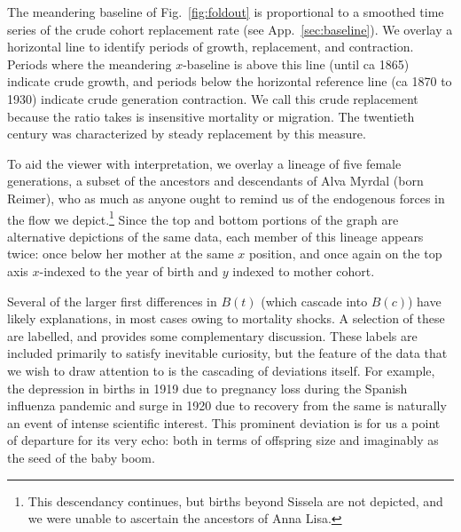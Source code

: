 \documentclass{article}
\begin{document}
The meandering baseline of Fig.~\ref{fig:foldout} is proportional to a smoothed time series of the crude cohort replacement rate (see App.~\ref{sec:baseline}). We overlay a horizontal line to identify periods of growth, replacement, and contraction. Periods where the meandering $x$-baseline is above this line (until ca 1865) indicate crude growth, and periods below the horizontal reference line (ca 1870 to 1930) indicate crude generation contraction. We call this crude replacement because the ratio takes is insensitive mortality or migration. The twentieth century was characterized by steady replacement by this measure.

To aid the viewer with interpretation, we overlay a lineage of five female generations, a subset of the ancestors and descendants of Alva Myrdal (born Reimer), who as much as anyone ought to remind us of the endogenous forces in the flow we depict.\footnote{This descendancy continues, but births beyond Sissela are not depicted, and we were unable to ascertain the ancestors of Anna Lisa.} Since the top and bottom portions of the graph are alternative depictions of the same data, each member of this lineage appears twice: once below her mother at the same $x$ position, and once again on the top axis $x$-indexed to the year of birth and $y$ indexed to mother cohort.

Several of the larger first differences in $B(t)$ (which cascade into $B(c)$) have likely explanations, in most cases owing to mortality shocks. A selection of these are labelled, and \cite{utterstrom1954some} provides some complementary discussion. These labels are included primarily to satisfy inevitable curiosity, but the feature of the data that we wish to draw attention to is the cascading of deviations itself. For example, the depression in births in 1919 due to pregnancy loss during the Spanish influenza pandemic and surge in 1920 due to recovery from the same \citep{BobergFazlic2017} is naturally an event of intense scientific interest. This prominent deviation is for us a point of departure for its very echo: both in terms of offspring size and imaginably as the seed of the baby boom. 
\end{document}
